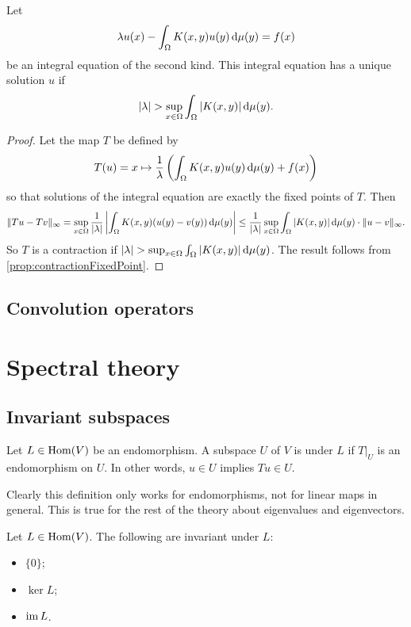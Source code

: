 \begin{proposition}
Let
\[ \lambda u(x) - \int_\Omega K(x,y)u(y)\operatorname{d \!}{\mu(y)} = f(x)\]
be an integral equation of the second kind. This integral equation has a unique solution $u$ if
\[ |\lambda| > \sup_{x\in \Omega} \int_{\Omega}|K(x,y)|\operatorname{d \!}{\mu(y)}. \]
\end{proposition}
\begin{proof}
Let the map $T$ be defined by
\[ T(u) = x\mapsto \frac{1}{\lambda}\left(\int_\Omega K(x,y)u(y)\operatorname{d \!}{\mu(y)} + f(x)\right) \]
so that solutions of the integral equation are exactly the fixed points of $T$. Then
\[ \lVert Tu-Tv\rVert_\infty = \sup_{x\in\Omega} \frac{1}{|\lambda|} \left|\int_\Omega K(x,y)(u(y)- v(y))\operatorname{d \!}{\mu(y)}\right| \leq \frac{1}{|\lambda|} \sup_{x\in \Omega} \int_{\Omega}|K(x,y)|\operatorname{d \!}{\mu(y)} \cdot \lVert u-v\rVert_\infty. \]
So $T$ is a contraction if $|\lambda| > \sup_{x\in \Omega} \int_{\Omega}|K(x,y)|\operatorname{d \!}{\mu(y)}$. The result follows from \ref{prop:contractionFixedPoint}.
\end{proof}

\section{Convolution operators}




\chapter{Spectral theory}
\section{Invariant subspaces}
\begin{definition}
Let $L\in \operatorname{Hom}(V)$ be an endomorphism. A subspace $U$ of $V$ is  under $L$ if $T|_U$ is an endomorphism on $U$. In other words, $u\in U$ implies $Tu\in U$.
\end{definition}
Clearly this definition only works for endomorphisms, not for linear maps in general. This is true for the rest of the theory about eigenvalues and eigenvectors.
\begin{example}
Let $L\in \operatorname{Hom}(V)$. The following are invariant under $L$:
\begin{itemize}
\item $\{0\}$;
\item $\ker L$;
\item $\operatorname{im} L$.
\end{itemize}
\end{example}

